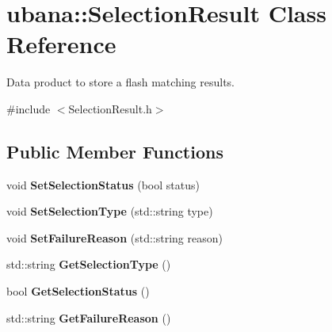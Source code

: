 \hypertarget{classubana_1_1SelectionResult}{\section{ubana\-:\-:Selection\-Result Class Reference}
\label{classubana_1_1SelectionResult}
}


Data product to store a flash matching results.  




{\ttfamily \#include $<$Selection\-Result.\-h$>$}

\subsection*{Public Member Functions}
\begin{DoxyCompactItemize}
\item 
\hypertarget{classubana_1_1SelectionResult_a1e042345d4fad423d897c944afb4a2c2}{void {\bfseries Set\-Selection\-Status} (bool status)}\label{classubana_1_1SelectionResult_a1e042345d4fad423d897c944afb4a2c2}

\item 
\hypertarget{classubana_1_1SelectionResult_a44cacfd834cb799f18938de7134c0086}{void {\bfseries Set\-Selection\-Type} (std\-::string type)}\label{classubana_1_1SelectionResult_a44cacfd834cb799f18938de7134c0086}

\item 
\hypertarget{classubana_1_1SelectionResult_ab7053b38033e245ffa2c9ad3c6a4b3dc}{void {\bfseries Set\-Failure\-Reason} (std\-::string reason)}\label{classubana_1_1SelectionResult_ab7053b38033e245ffa2c9ad3c6a4b3dc}

\item 
\hypertarget{classubana_1_1SelectionResult_ac1b21a0690e27bd01ad9ac20afa2d161}{std\-::string {\bfseries Get\-Selection\-Type} ()}\label{classubana_1_1SelectionResult_ac1b21a0690e27bd01ad9ac20afa2d161}

\item 
\hypertarget{classubana_1_1SelectionResult_a2a45390dcb4c138003158a76ac94a8a8}{bool {\bfseries Get\-Selection\-Status} ()}\label{classubana_1_1SelectionResult_a2a45390dcb4c138003158a76ac94a8a8}

\item 
\hypertarget{classubana_1_1SelectionResult_a8b944eb143cb58faad70480c0600bb36}{std\-::string {\bfseries Get\-Failure\-Reason} ()}\label{classubana_1_1SelectionResult_a8b944eb143cb58faad70480c0600bb36}

\end{DoxyCompactItemize}


